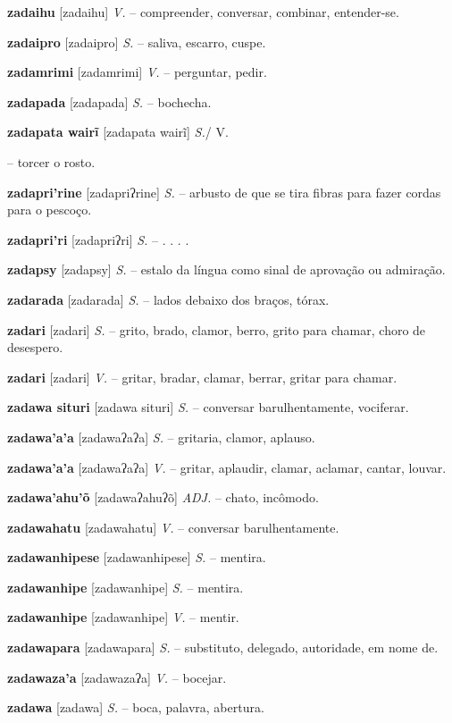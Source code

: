 {{{{\textbf{zadaihu} [zadaihu] \textit{V.} -- compreender, conversar, combinar, entender-se.

\textbf{zadaipro} [zadaipro] \textit{S.} -- saliva, escarro, cuspe.

\textbf{zadamrimi} [zadamrimi] \textit{V.} -- perguntar, pedir.

\textbf{zadapada} [zadapada] \textit{S.} -- bochecha.

\textbf{zadapata wairĩ} [zadapata wairĩ] \textit{S.}/ V.} -- torcer o rosto.

\textbf{zadapri'rine} [zadapriʔrine] \textit{S.} -- arbusto de que se tira fibras para fazer cordas para o pescoço.

\textbf{zadapri'ri} [zadapriʔri] \textit{S.} -- . . . .

\textbf{zadapsy} [zadapsy] \textit{S.} -- estalo da língua como sinal de aprovação ou admiração.

\textbf{zadarada} [zadarada] \textit{S.} -- lados debaixo dos braços, tórax.

\textbf{zadari} [zadari] \textit{S.} -- grito, brado, clamor, berro, grito para chamar, choro de desespero.

\textbf{zadari} [zadari] \textit{V.} -- gritar, bradar, clamar, berrar, gritar para chamar.

\textbf{zadawa situri} [zadawa situri] \textit{S.} -- conversar barulhentamente, vociferar.

\textbf{zadawa'a'a} [zadawaʔaʔa] \textit{S.} -- gritaria, clamor, aplauso.

\textbf{zadawa'a'a} [zadawaʔaʔa] \textit{V.} -- gritar, aplaudir, clamar, aclamar, cantar, louvar.

\textbf{zadawa'ahu'õ} [zadawaʔahuʔõ] \textit{ADJ.} -- chato, incômodo.

\textbf{zadawahatu} [zadawahatu] \textit{V.} -- conversar barulhentamente.

\textbf{zadawanhipese} [zadawanhipese] \textit{S.} -- mentira.

\textbf{zadawanhipe} [zadawanhipe] \textit{S.} -- mentira.

\textbf{zadawanhipe} [zadawanhipe] \textit{V.} -- mentir.

\textbf{zadawapara} [zadawapara] \textit{S.} -- substituto, delegado, autoridade, em nome de.

\textbf{zadawaza'a} [zadawazaʔa] \textit{V.} -- bocejar.

\textbf{zadawa} [zadawa] \textit{S.} -- boca, palavra, abertura.

}}}
